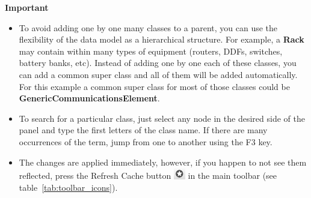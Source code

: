 \documentclass[a4paper]{article}
\begin{document}
	\begin{framed} {\large \textbf{Important}}
		\begin{itemize}
			\item To avoid adding one by one many classes to a parent, you can use the flexibility of the data model as a hierarchical structure. For example, a \textbf{Rack} may contain within many types of equipment (routers, DDFs, switches, battery banks, etc). Instead of adding one by one each of these classes, you can add a common super class and all of them will be added automatically. For this example a common super class for most of those classes could be \textbf{GenericCommunicationsElement}.
			\item To search for a particular class, just select any node in the desired side of the panel and type the first letters of the class name. If there are many occurrences of the term, jump from one to another using the F3 key.
			\item The changes are applied immediately, however, if you happen to not see them reflected, press the Refresh Cache button \includegraphics[width=0.5cm]{img/icon_refresh_cache.png} in the main toolbar (see table~\ref{tab:toolbar_icons}).
		\end{itemize}
	\end{framed}
	
	\newpage
\end{document}
